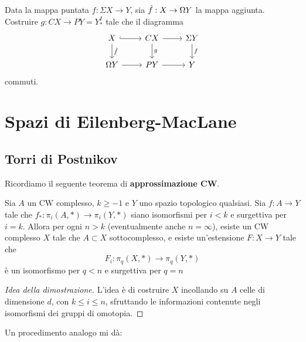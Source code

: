\begin{exercise}
	Data la mappa puntata $f: \Sigma X \to Y$,
	sia $\Hat{f}:X \to \Omega Y$ la mappa aggiunta.
	Costruire $g:CX \to PY=Y^{I}_{*}$ tale che il diagramma
	\begin{equation*}
		\begin{tikzcd}
			X \ar[r, hook] \ar[d, "\Hat{f}"] 
			& CX \ar[d, "g"] \ar[r] 
			& \Sigma Y \ar[d, "f"] \\ 
			\Omega Y \ar[r] & PY \ar[r] & Y
		\end{tikzcd}
	\end{equation*}
	commuti.
\end{exercise}




\chapter{Spazi di Eilenberg-MacLane}

\section{Torri di Postnikov}

Ricordiamo il seguente teorema di \textbf{approssimazione CW}.
\begin{thm}\label{CW-approx}
	Sia $A$ un CW complesso, $k \ge -1$ e $Y$ uno spazio topologico qualsiasi.
	Sia $f:A \to Y$ tale che
	$f_{*}:\pi_{i}(A,\ast) \to \pi_{i}(Y,\ast)$
	siano isomorfismi per $i < k$ e surgettiva per $i = k$.
	Allora per ogni $n > k$ (eventualmente anche $n=\infty$),
	esiste un CW complesso $X$ tale che $A \subset X$ sottocomplesso,
	e esiste un'estensione $F:X \to Y$ tale che
	\begin{equation*}
		F_{i} : \pi_{q}(X,\ast) \longrightarrow \pi_{q}(Y,\ast)
	\end{equation*}
	è un isomorfismo per $q < n$ e surgettiva per $q=n$
	\begin{proof}[Idea della dimostrazione]
		L'idea è di costruire $X$ 
		incollando su $A$ celle di dimensione $d$,
		con $k \le i \le n$,
		sfruttando le informazioni contenute
		negli isomorfismi dei gruppi di omotopia.
	\end{proof}
\end{thm}

Un procedimento analogo mi dà:

